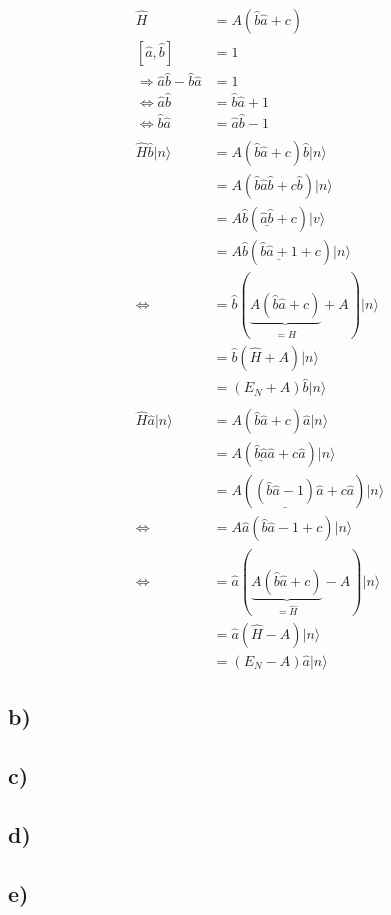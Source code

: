     \begin{align*}
        \hat{H} &= A\left( \hat{b}\hat{a} + c \right)\\
        \left[ \hat{a}, \hat{b} \right] &= 1\\
        \Rightarrow \hat{a}\hat{b} - \hat{b}\hat{a} &= 1\\
        \Leftrightarrow \hat{a}\hat{b} &= \hat{b}\hat{a} + 1\\
        \Leftrightarrow \hat{b}\hat{a} &= \hat{a}\hat{b} - 1\\
        \\
        \hat{H}\hat{b} \vert n \rangle &= A\left( \hat{b}\hat{a} +c \right)\hat{b} \vert n \rangle\\
        &= A\left(\hat{b}\hat{a}\hat{b}+c\hat{b} \right) \vert n \rangle\\
        &= A\hat{b} \left( \underline{\hat{a}\hat{b}} +c \right) \vert v \rangle\\
        &= A\hat{b} \left( \underline{\hat{b}\hat{a} + 1} + c \right) \vert n \rangle\\
        \Leftrightarrow &= \hat{b} \left(\underbrace{A\left(\hat{b}\hat{a}+c \right)}_{=\hat{H}} + A \right) \vert n \rangle\\
        &= \hat{b} \left( \hat{H} + A \right) \vert n \rangle\\
        &= \left( E_N + A \right) \hat{b} \vert n \rangle\\
        \\
        \hat{H}\hat{a} \vert n \rangle &= A\left( \hat{b}\hat{a} +c \right)\hat{a} \vert n \rangle\\ 
        &= A\left(\underline{\hat{b}\hat{a}}\hat{a}+c\hat{a} \right) \vert n \rangle\\
        &= A\left( \underline{\left( \hat{b}\hat{a}-1  \right)} \hat{a} + c\hat{a} \right)\vert n \rangle\\
        \Leftrightarrow &= A\hat{a} \left( \hat{b}\hat{a} - 1 + c \right) \vert n \rangle\\
        \Leftrightarrow &= \hat{a} \left(\underbrace{A\left(\hat{b}\hat{a}+c \right)}_{=\hat{H}} - A \right) \vert n \rangle\\
        &= \hat{a} \left( \hat{H} - A \right) \vert n \rangle\\
        &= \left( E_N - A \right) \hat{a} \vert n \rangle
    \end{align*}

    \subsection{b)}

    \subsection{c)}

    \subsection{d)}

    \subsection{e)}

